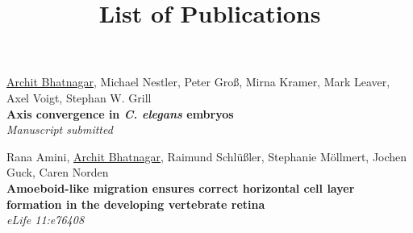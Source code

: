 \documentclass[a4paper]{article}
\title{List of Publications}
\date{}
\begin{document}
\maketitle 
\thispagestyle{empty}

\underline{Archit Bhatnagar}, Michael Nestler, Peter Groß, Mirna Kramer, Mark Leaver, Axel Voigt, Stephan W. Grill\\
\textbf{Axis convergence in \textit{C. elegans} embryos}\\
\textit{Manuscript submitted}

Rana Amini, \underline{Archit Bhatnagar}, Raimund Schl{\"u}ßler, Stephanie M{\"o}llmert, Jochen Guck, Caren Norden\\
\textbf{Amoeboid-like migration ensures correct horizontal cell layer formation in the developing vertebrate retina}\\
\textit{eLife 11:e76408}
\end{document}
